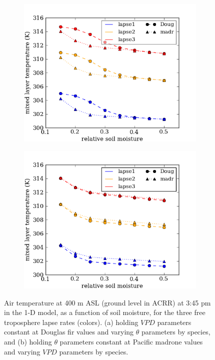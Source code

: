 \begin{figure}[here]
\begin{subfigure}{0.5\textwidth}
\includegraphics[width=\textwidth]{ch2-BL/figures/theta_afternoon_T.png}
\caption{}
\end{subfigure}
\begin{subfigure}{0.5\textwidth}
\includegraphics[width=\textwidth]{ch2-BL/figures/VPD_afternoon_T.png}
\caption{}
\end{subfigure}
\caption{Air temperature at 400 m ASL (ground level in ACRR) at 3:45 pm in the 1-D model, as a function of soil moisture, for the three free troposphere lapse rates (colors).  (a) holding $VPD$ parameters constant at Douglas fir values and varying $\theta$ parameters by species, and (b) holding $\theta$ parameters constant at Pacific madrone values and varying $VPD$ parameters by species.}
\label{fig:BL_testVPDtheta}
\end{figure}

